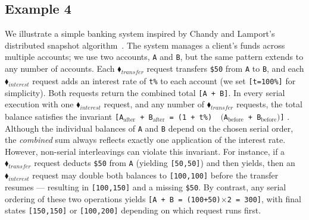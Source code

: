 	
\subsection{Example 4}


We illustrate a simple banking system inspired by Chandy and Lamport’s distributed snapshot algorithm~\cite{ChLa85}.  The system manages a client’s funds across multiple accounts; we use two accounts, \texttt{A} and \texttt{B}, but the same pattern extends to any number of accounts.  
%
Each {\color{ForestGreen}$\blacklozenge_{\mathit{transfer}}$} request transfers \texttt{\$50} from \texttt{A} to \texttt{B}, and each {\color{ForestGreen}$\blacklozenge_{\mathit{interest}}$} request adds an interest rate of \texttt{t\%} to each account (we set \texttt{[t=100\%]} for simplicity).
Both requests return the combined total \texttt{[A + B]}.
%
In every serial execution with one {\color{ForestGreen}$\blacklozenge_{\mathit{interest}}$} request, and any number of {\color{ForestGreen}$\blacklozenge_{\mathit{transfer}}$} requests, the total balance satisfies the invariant
\texttt{[A$_{\text{after}}$ + B$_{\text{after}}$ = (1 + t\%) \,$\bigl($A$_{\text{before}}$ + B$_{\text{before}}\bigr)$]}
.
%
%
Although the individual balances of \texttt{A} and \texttt{B} depend on the chosen serial order, the \textit{combined} sum always reflects exactly one application of the interest rate.
%
However, non-serial interleavings can violate this invariant.  For instance, if a {\color{ForestGreen}$\blacklozenge_{\mathit{transfer}}$} request deducts \texttt{\$50} from \texttt{A} (yielding \texttt{[50,50]}) and then yields, then an {\color{ForestGreen}$\blacklozenge_{\mathit{interest}}$} request may double both balances to \texttt{[100,100]} before the transfer resumes --- resulting in \texttt{[100,150]} and a missing \texttt{\$50}.  By contrast, any serial ordering of these two operations yields \texttt{[A + B = (100+50)$\times$2 = 300]}, with final states \texttt{[150,150]} or \texttt{[100,200]} depending on which request runs first.
%
%

